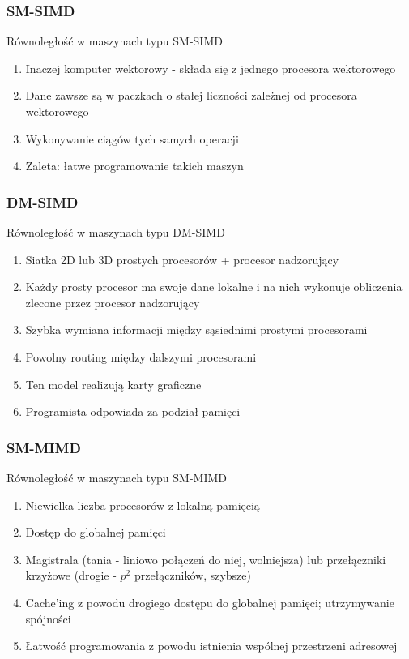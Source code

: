 \documentclass{beamer}
\begin{document}
\subsubsection{SM-SIMD}

\begin{frame}{Równoległość w maszynach typu SM-SIMD}
  \begin{enumerate}
  \item Inaczej komputer wektorowy - składa się z jednego procesora wektorowego
  \item Dane zawsze są w paczkach o stałej liczności zależnej od procesora wektorowego
  \item Wykonywanie ciągów tych samych operacji
  \item Zaleta: łatwe programowanie takich maszyn
  \end{enumerate}
\end{frame}

\subsubsection{DM-SIMD}

\begin{frame}{Równoległość w maszynach typu DM-SIMD}
  \begin{enumerate}
  \item Siatka 2D lub 3D prostych procesorów + procesor nadzorujący
  \item Każdy prosty procesor ma swoje dane lokalne i na nich wykonuje obliczenia zlecone przez procesor nadzorujący
  \item Szybka wymiana informacji między sąsiednimi prostymi procesorami
  \item Powolny routing między dalszymi procesorami
  \item Ten model realizują karty graficzne
  \item Programista odpowiada za podział pamięci
  \end{enumerate}
\end{frame}

\subsubsection{SM-MIMD}

\begin{frame}{Równoległość w maszynach typu SM-MIMD}
  \begin{enumerate}
  \item Niewielka liczba procesorów z lokalną pamięcią
  \item Dostęp do globalnej pamięci
  \item Magistrala (tania - liniowo połączeń do niej, wolniejsza) lub przełączniki krzyżowe (drogie - $p^2$ przełączników, szybsze)
  \item Cache'ing z powodu drogiego dostępu do globalnej pamięci; utrzymywanie spójności
  \item Łatwość programowania z powodu istnienia wspólnej przestrzeni adresowej
  \end{enumerate}
\end{frame}
\end{document}
